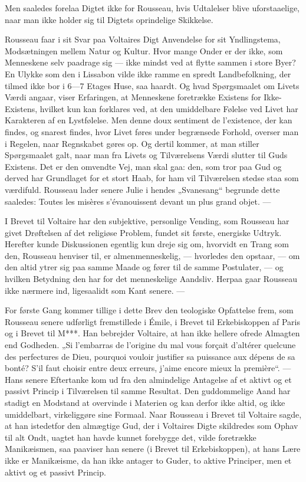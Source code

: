 \documentclass[12pt,a4paper,openany]{book}
\newcommand{\opage}[1]{\marginnote{\footnotesize\textit{[#1]}}}
\begin{document}
Men saaledes forelaa Digtet ikke for Rousseau, hvis Udtalelser
blive uforstaaelige, naar man ikke holder sig til Digtets
oprindelige Skikkelse.

Rousseau faar i sit Svar paa Voltaires Digt Anvendelse for
\setcounter{footnote}{0}%
\opage{153}sit Yndlingstema, Modsætningen mellem Natur og Kultur. Hvor
mange Onder er der ikke, som Menneskene selv paadrage sig
--- ikke mindst ved at flytte sammen i store Byer? En Ulykke
som den i Lissabon vilde ikke ramme en spredt Landbefolkning,
der tilmed ikke bor i 6---7 Etages Huse, saa haardt. Og hvad
Spørgsmaalet om Livets Værdi angaar, viser Erfaringen, at Menneskene
foretrække Existens for Ikke-Existens, hvilket kun kan
forklares ved, at den umiddelbare Følelse ved Livet har Karakteren
af en Lystfølelse. Men denne doux sentiment de l’existence,
der kan findes, og snarest findes, hvor Livet føres under
begrænsede Forhold, overser man i Regelen, naar Regnskabet
gøres op. Og dertil kommer, at man stiller Spørgsmaalet galt,
naar man fra Livets og Tilværelsens Værdi slutter til Guds
Existens. Det er den omvendte Vej, man skal gaa: den, som
tror paa Gud og derved har Grundlaget for et stort Haab, for
ham vil Tilværelsen stedse staa som værdifuld. Rousseau lader
senere Julie i hendes „Svanesang“ begrunde dette saaledes:
Toutes les misères s’évanouissent devant un plus grand objet. ---

I Brevet til Voltaire har den subjektive, personlige Vending,
som Rousseau har givet Drøftelsen af det religiøse Problem,
fundet sit første, energiske Udtryk. Herefter kunde
Diskussionen egentlig kun dreje sig om, hvorvidt en Trang som
den, Rousseau henviser til, er almenmenneskelig, --- hvorledes
den opstaar, --- om den altid ytrer sig paa samme Maade og
fører til de samme Postulater, --- og hvilken Betydning den har
for det menneskelige Aandsliv. Herpaa gaar Rousseau ikke
nærmere ind, ligesaalidt som Kant senere. ---

For første Gang kommer tillige i dette Brev den teologiske
Opfattelse frem, som Rousseau senere udførligt fremstillede i
Émile, i Brevet til Erkebiskoppen af Paris og i Brevet til M***.
Han bebrejder Voltaire, at han ikke hellere ofrede Almagten
end Godheden. „Si l’embarras de l’origine du mal vous forçait
d’altérer quelcune des perfectures de Dieu, pourquoi vouloir
justifier sa puissance aux dépens de sa bonté? S’il faut choisir
entre deux erreurs, j’aime encore mieux la première“. --- Hans
senere Eftertanke kom ud fra den almindelige Antagelse af et
aktivt og et passivt Princip i Tilværelsen til samme Resultat.
\setcounter{footnote}{0}%
\opage{154}Den guddommelige Aand har stadigt en Modstand at overvinde
i Materien og kan derfor ikke altid, og ikke umiddelbart, virkeliggøre
sine Formaal. Naar Rousseau i Brevet til Voltaire sagde,
at han istedetfor den almægtige Gud, der i Voltaires Digte skildredes
som Ophav til alt Ondt, uagtet han havde kunnet forebygge
det, vilde foretrække Manikæismen, saa paaviser han
senere (i Brevet til Erkebiskoppen), at hans Lære ikke er Manikæisme,
da han ikke antager to Guder, to aktive Principer,
men et aktivt og et passivt Princip.
\end{document}
